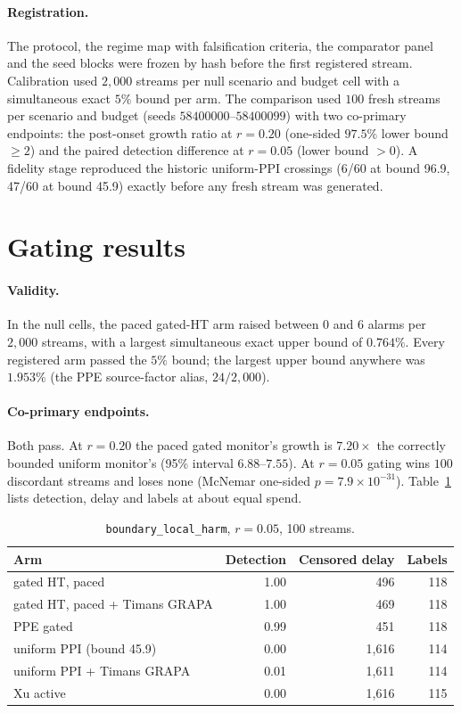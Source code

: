 \paragraph{Registration.}
The protocol, the regime map with falsification criteria, the comparator panel and the seed blocks were frozen by hash before the first registered stream.
Calibration used $2{,}000$ streams per null scenario and budget cell with a simultaneous exact $5\%$ bound per arm.
The comparison used $100$ fresh streams per scenario and budget (seeds $58400000$--$58400099$) with two co-primary endpoints:
the post-onset growth ratio at $r=0.20$ (one-sided $97.5\%$ lower bound $\ge2$) and the paired detection difference at $r=0.05$ (lower bound $>0$).
A fidelity stage reproduced the historic uniform-PPI crossings (6/60 at bound 96.9, 47/60 at bound 45.9) exactly before any fresh stream was generated.

\section{Gating results}\label{sec:gating}

\paragraph{Validity.}
In the null cells, the paced gated-HT arm raised between $0$ and $6$ alarms per $2{,}000$ streams, with a largest simultaneous exact upper bound of $0.764\%$.
Every registered arm passed the $5\%$ bound; the largest upper bound anywhere was $1.953\%$ (the PPE source-factor alias, $24/2{,}000$).

\paragraph{Co-primary endpoints.}
Both pass. At $r=0.20$ the paced gated monitor's growth is $7.20\times$ the correctly bounded uniform monitor's (95\% interval $6.88$--$7.55$).
At $r=0.05$ gating wins $100$ discordant streams and loses none (McNemar one-sided $p=7.9\times10^{-31}$).
Table~\ref{tab:r05} lists detection, delay and labels at about equal spend.

\begin{table}[t]
\centering
\caption{\texttt{boundary\_local\_harm}, $r=0.05$, 100 streams.}
\label{tab:r05}
\begin{tabular}{lrrr}
\toprule
Arm & Detection & Censored delay & Labels \\
\midrule
gated HT, paced & 1.00 & 496 & 118 \\
gated HT, paced + Timans GRAPA & 1.00 & 469 & 118 \\
PPE gated & 0.99 & 451 & 118 \\
uniform PPI (bound 45.9) & 0.00 & 1{,}616 & 114 \\
uniform PPI + Timans GRAPA & 0.01 & 1{,}611 & 114 \\
Xu active & 0.00 & 1{,}616 & 115 \\
\bottomrule
\end{tabular}
\end{table}

